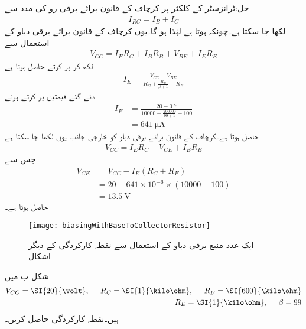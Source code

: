 حل:ٹرانزسٹر کے کلکٹر  پر کرچاف کے قانون برائے برقی رو کی مدد سے
\begin{align*}
I_{RC}=I_B+I_C
\end{align*}
لکھا جا سکتا ہے۔چونکہ  ہوتا ہے لہٰذا  ہو گا۔یوں کرچاف کے قانون برائے برقی دباو کے استعمال سے
\begin{align*}
V_{CC}=I_{E} R_C+I_B R_B +V_{BE}+I_E R_E 
\end{align*}
لکھ کر  پر کرتے حاصل ہوتا ہے
\begin{align*}
I_E=\frac{V_{CC}-V_{BE}}{R_C+\frac{R_B}{\beta+1}+R_E}
\end{align*}
دئے گئے قیمتیں پر کرتے ہوئے
\begin{align*}
I_E&=\frac{20-0.7}{10000+\frac{200000}{99+1}+100}\\
&=\SI{641}{\micro \ampere}
\end{align*}
حاصل ہوتا ہے۔کرچاف کے قانون برائے برقی دباو کو خارجی جانب یوں لکھا جا سکتا ہے
\begin{align*}
V_{CC}=I_E R_C+V_{CE}+I_E R_E
\end{align*}
جس سے
\begin{align*}
V_{CE}&=V_{CC}-I_E \left(R_C+R_E \right)\\
&=20-641 \times 10^{-6} \times \left (10000+100 \right)\\
&=\SI{13.5}{\volt}
\end{align*}
حاصل ہوتا ہے۔
%
\begin{figure}
\centering
\texttt{[image: biasingWithBaseToCollectorResistor]}
\caption{ایک عدد منبع برقی دباو کے استعمال سے نقطہ کارکردگی کے دیگر  اشکال}
\label{شکل_ایک_منبع_سے_نکتہ_کارکردگی_کا_حصول}
\end{figure}
شکل  ب میں 
\begin{align*}
V_{CC}=\SI{20}{\volt}, \hspace{5mm} R_C=\SI{1}{\kilo \ohm}, \hspace{5mm} R_B=\SI{600}{\kilo \ohm}\\
R_E=\SI{1}{\kilo \ohm}, \hspace{5mm} \beta=99
\end{align*}
ہیں۔نقطہ کارکردگی حاصل کریں۔

